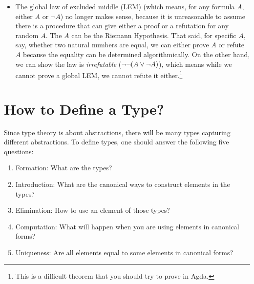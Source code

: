 \documentclass[11pt]{article}
\begin{document}
\begin{enumerate}
\begin{itemize}
      \item The global law of excluded middle (LEM) (which means, for any formula $A$, either $A$ or $\neg A$) no longer makes sense, because it is unreasonable to assume there is a procedure that can give either a proof or a refutation for any random $A$. The $A$ can be the Riemann Hypothesis. That said, for specific $A$, say, whether two natural numbers are equal, we can either prove $A$ or refute $A$ because the equality can be determined algorithmically. On the other hand, we can show the law is \emph{irrefutable} ($\neg \neg (A \vee \neg A)$), which means while we cannot prove a global LEM, we cannot refute it either.\footnote{This is a difficult theorem that you should try to prove in Agda.}
    \end{itemize}
\end{enumerate}

\section{How to Define a Type?}

Since type theory is about abstractions, there will be many types capturing different abstractions. To define types, one should answer the following five questions:

\begin{enumerate}
  \item Formation: What are the types?
  \item Introduction: What are the canonical ways to construct elements in the types?
  \item Elimination: How to use an element of those types?
  \item Computation: What will happen when you are using elements in canonical forms?
  \item Uniqueness: Are all elements equal to some elements in canonical forms?
\end{enumerate}
\end{document}
